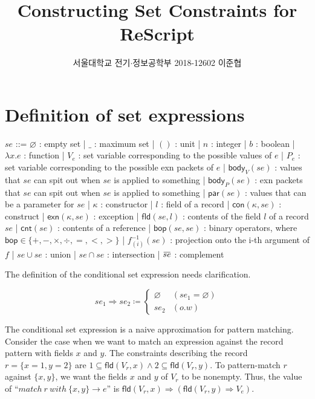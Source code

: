 \documentclass{article}
\title{Constructing Set Constraints for ReScript}
\author{서울대학교 전기$\cdot$정보공학부 2018-12602 이준협}
\date{}
\newcommand{\loverbar}[1]{\mkern 1.5mu\overline{\mkern-1.5mu#1\mkern-1.5mu}\mkern 1.5mu}
\begin{document}
\maketitle
\section{Definition of set expressions}
\begin{bnfgrammar}
  $se$ ::= $\varnothing$ : empty set
  | $\_$ : maximum set
  | $()$ : unit
  | $n$ : integer
  | $b$ : boolean
  | $\lambda x.e$ : function
  | $V_{e}$ : set variable corresponding to the possible values of $e$
  | $P_{e}$ : set variable corresponding to the possible exn packets of $e$
  | $\mathsf{body}_{V}(se)$ : values that $se$ can spit out when $se$ is applied to something
  | $\mathsf{body}_{P}(se)$ : exn packets that $se$ can spit out when $se$ is applied to something
  | $\mathsf{par}(se)$ : values that can be a parameter for $se$
  | $\kappa$ : constructor
  | $l$ : field of a record
  | $\mathsf{con}(\kappa,se)$ : construct
  | $\mathsf{exn}(\kappa,se)$ : exception
  | $\mathsf{fld}(se, l)$ : contents of the field $l$ of a record $se$
  | $\mathsf{cnt}(se)$ : contents of a reference
  | $\mathsf{bop}(se, se)$ : binary operators, where $\mathsf{bop}\in\{+, -, \times, \div, =, <, >\}$
  | $f^{-1}_{(i)}(se)$ : projection onto the i-th argument of $f$
  | $se \cup se$ : union
  | $se \cap se$ : intersection
  | $\loverbar{se}$ : complement
\end{bnfgrammar}

The definition of the conditional set expression needs clarification.

\[
  se_{1} \Rightarrow se_{2} \coloneq
  \begin{cases}
    \varnothing & (se_{1}=\varnothing)\\
    se_{2} & (o.w)
  \end{cases}
\]

The conditional set expression is a naive approximation for pattern matching. Consider the case when we want to match an expression against the record pattern with fields $x$ and $y$.
The constraints describing the record $r = \{x = 1, y = 2\}$ are $1 \subseteq \mathsf{fld}(V_{r}, x) \wedge 2 \subseteq \mathsf{fld}(V_{r}, y)$.
To pattern-match $r$ against $\{x, y\}$, we want the fields $x$ and $y$ of $V_{r}$ to be nonempty.
Thus, the value of ``$match\:r\:with\:\{x, y\}\rightarrow e$'' is $\mathsf{fld}(V_{r}, x)\Rightarrow(\mathsf{fld}(V_{r},y)\Rightarrow V_{e})$.
\end{document}
